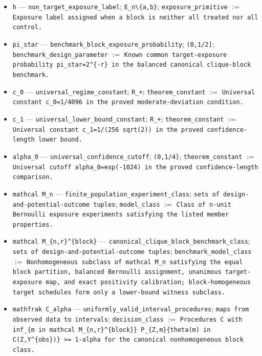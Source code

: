 \documentclass{article}
\begin{document}
\begin{itemize}
  \item \texttt{h} --- \texttt{non\_target\_exposure\_label}; \texttt{E\_n\textbackslash{}\{a,b\}}; \texttt{exposure\_primitive} $:=$ \texttt{Exposure label assigned when a block is neither all treated nor all control.}
  \item \texttt{pi\_star} --- \texttt{benchmark\_block\_exposure\_probability}; \texttt{(0,1/2]}; \texttt{benchmark\_design\_parameter} $:=$ \texttt{Known common target-exposure probability pi\_star=2\textasciicircum{}\{-r\} in the balanced canonical clique-block benchmark.}
  \item \texttt{c\_0} --- \texttt{universal\_regime\_constant}; \texttt{R\_+}; \texttt{theorem\_constant} $:=$ \texttt{Universal constant c\_0=1/4096 in the proved moderate-deviation condition.}
  \item \texttt{c\_1} --- \texttt{universal\_lower\_bound\_constant}; \texttt{R\_+}; \texttt{theorem\_constant} $:=$ \texttt{Universal constant c\_1=1/(256 sqrt(2)) in the proved confidence-length lower bound.}
  \item \texttt{alpha\_0} --- \texttt{universal\_confidence\_cutoff}; \texttt{(0,1/4]}; \texttt{theorem\_constant} $:=$ \texttt{Universal cutoff alpha\_0=exp(-1024) in the proved confidence-length comparison.}
  \item \texttt{mathcal M\_n} --- \texttt{finite\_population\_experiment\_class}; \texttt{sets of design-and-potential-outcome tuples}; \texttt{model\_class} $:=$ \texttt{Class of n-unit Bernoulli exposure experiments satisfying the listed member properties.}
  \item \texttt{mathcal M\_\{n,r\}\textasciicircum{}\{block\}} --- \texttt{canonical\_clique\_block\_benchmark\_class}; \texttt{sets of design-and-potential-outcome tuples}; \texttt{benchmark\_model\_class} $:=$ \texttt{Nonhomogeneous subclass of mathcal M\_n satisfying the equal block partition, balanced Bernoulli assignment, unanimous target-exposure map, and exact positivity calibration; block-homogeneous target schedules form only a lower-bound witness subclass.}
  \item \texttt{mathfrak C\_alpha} --- \texttt{uniformly\_valid\_interval\_procedures}; \texttt{maps from observed data to intervals}; \texttt{decision\_class} $:=$ \texttt{Procedures C with inf\_\{m in mathcal M\_\{n,r\}\textasciicircum{}\{block\}\} P\_\{Z,m\}\{theta(m) in C(Z,Y\textasciicircum{}\{obs\})\} >= 1-alpha for the canonical nonhomogeneous block class.}
\end{itemize}
\end{document}
